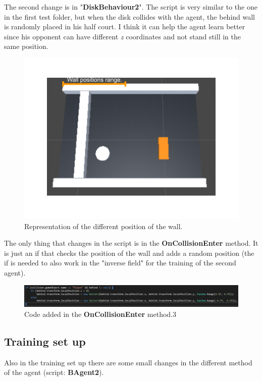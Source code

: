 \documentclass[12pt]{article}
\begin{document}
	\noindent
	The second change is in "\textbf{DiskBehaviour2}". The script is very similar to the one in the first test folder, but when the disk collides with the agent, the behind wall is randomly placed in his half court. I think it can help the agent learn better since his opponent can have different \textit{z} coordinates and not stand still in the same position.
	
	\begin{figure}[hbt!]
		\centering
		\includegraphics[width= 0.82
		\textwidth]{images/BehindWall.png}
		\caption{Representation of the different position of the wall.}
	\end{figure}
	
	\noindent
	The only thing that changes in the script is in the \textbf{OnCollisionEnter} method. It is just an if that checks the position of the wall and adds a random position (the if is needed to also work in the "inverse field" for the training of the second agent).
	
	\begin{figure}[hbt!]
		\centering
		\includegraphics[width= 1.25
		\textwidth]{images/DiskBehaviour2.png}
		\caption{Code added in the \textbf{OnCollisionEnter} method.3}
	\end{figure}

	\subsection{Training set up}
	
	Also in the training set up there are some small changes in the different method of the agent (script: \textbf{BAgent2}).
	
\end{document}
